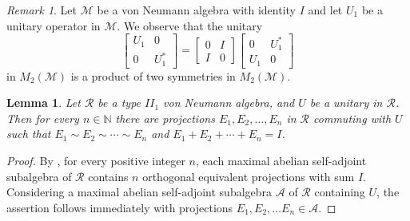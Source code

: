 \documentclass[12pt, preprint]{amsart}
\newtheorem{lem}[thm]{Lemma}
\newcommand{\N}{\mathbb{N}}
\theoremstyle{definition}
\theoremstyle{remark}
\newtheorem{remark}[thm]{Remark}
\numberwithin{equation}{section}
\theoremstyle{ser}
\theoremstyle{serr}
\theoremstyle{ser}
\begin{document}
\begin{remark}
\label{rmrk:symprod_vNa}
Let $\mathscr{M}$ be a von Neumann algebra with identity $I$ and let $U_1$ be a unitary operator in $\mathscr{M}$. We observe that the unitary $$
\begin{bmatrix}
U_1 & 0\\
0 & U_1 ^*
\end{bmatrix} =
\begin{bmatrix}
0 & I\\
I & 0
\end{bmatrix}
\begin{bmatrix}
0 & U_1 ^*\\
U_1 & 0
\end{bmatrix}
$$ in $M_2(\mathscr{M})$ is a product of two symmetries in $M_2(\mathscr{M})$. 

\end{remark}

\begin{lem}
\label{lem:II1_masa_dec}
\textsl{
Let $\mathscr{R}$ be a type $II_1$ von Neumann algebra, and $U$ be a unitary in $\mathscr{R}$. Then for every $n \in \N$ there are projections $E_1, E_2, \ldots, E_n$ in $\mathscr{R}$ commuting with $U$ such that $E_1 \sim E_2 \sim \cdots \sim E_n$ and $E_1 + E_2 + \cdots + E_n = I$.}
\end{lem}
\begin{proof}
By \cite[Corollary 3.15]{diag_kadison}, for every positive integer $n$, each maximal abelian self-adjoint subalgebra of $\mathscr{R}$ contains $n$ orthogonal equivalent projections with sum $I$. Considering a maximal abelian self-adjoint subalgebra $\mathscr{A}$ of $\mathscr{R}$ containing $U$, the assertion follows immediately with projections $E_1, E_2, \ldots E_n \in \mathscr{A}$. 
\end{proof}
\end{document}
